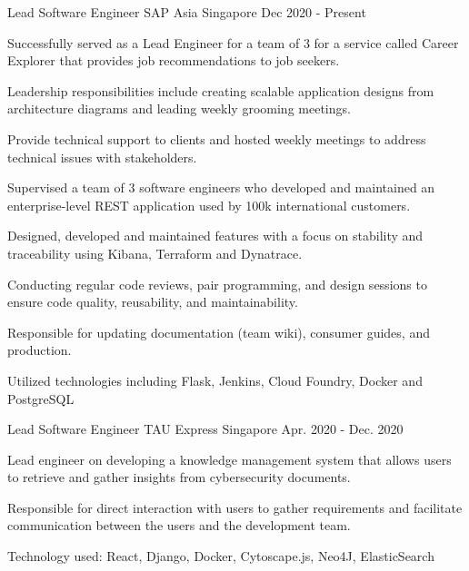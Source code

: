 

\begin{cventries}

  \cventry
    {Lead Software Engineer} %
    {SAP Asia} %
    {Singapore} %
    {Dec 2020 - Present} %
    {
      \begin{cvitems} %
        \item {Successfully served as a Lead Engineer for a team of 3 for a service called Career Explorer that provides job recommendations to job seekers.}
        \item {Leadership responsibilities include creating scalable application designs from architecture diagrams and leading weekly grooming meetings.}
        \item {Provide technical support to clients and hosted weekly meetings to address technical issues with stakeholders. }
        \item {Supervised a team of 3 software engineers who developed and maintained an enterprise-level REST application used by 100k international customers.}
        \item {Designed, developed and maintained features with a focus on stability and traceability using Kibana, Terraform and Dynatrace. }
        \item {Conducting regular code reviews, pair programming, and design sessions to ensure code quality, reusability, and maintainability. }
        \item {Responsible for updating documentation (team wiki), consumer guides, and production.}
        \item {Utilized technologies including Flask, Jenkins, Cloud Foundry, Docker and PostgreSQL}
      \end{cvitems}
    }

  \cventry
    {Lead Software Engineer} %
    {TAU Express} %
    {Singapore} %
    {Apr. 2020 - Dec. 2020} %
    {
      \begin{cvitems} %
        \item {Lead engineer on developing a knowledge management system that allows users to retrieve and gather insights from cybersecurity documents.}
        \item {Responsible for direct interaction with users to gather requirements and facilitate communication between the users and the development team.}
        \item {Technology used: React, Django, Docker, Cytoscape.js, Neo4J, ElasticSearch}
     \end{cvitems}
    }


\end{cventries}
